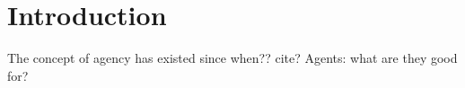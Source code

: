 \section{Introduction}
The concept of agency has existed since when?? cite?
Agents: what are they good for? 